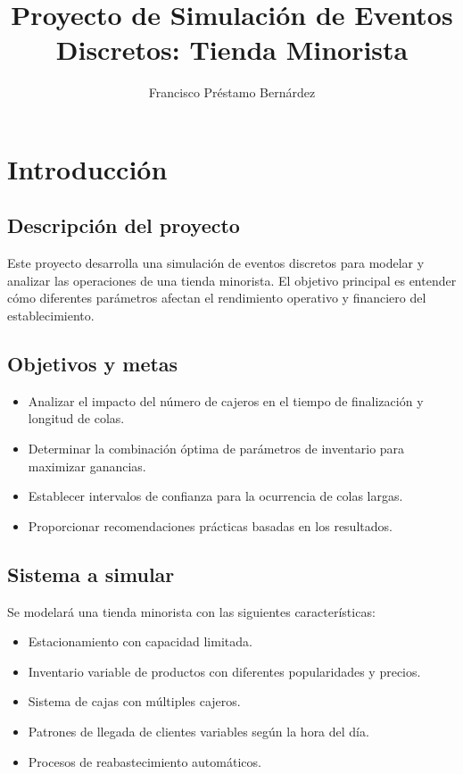 \documentclass[12pt, a4paper]{article}
\title{Proyecto de Simulación de Eventos Discretos: Tienda Minorista}
\author{Francisco Préstamo Bernárdez}
\date{}
\begin{document}
\maketitle

\newpage

\section{Introducción}

\subsection{Descripción del proyecto}
Este proyecto desarrolla una simulación de eventos discretos para modelar y analizar las operaciones de una tienda minorista. El objetivo principal es entender cómo diferentes parámetros afectan el rendimiento operativo y financiero del establecimiento.

\subsection{Objetivos y metas}
\begin{itemize}
    \item Analizar el impacto del número de cajeros en el tiempo de finalización y longitud de colas.
    \item Determinar la combinación óptima de parámetros de inventario para maximizar ganancias.
    \item Establecer intervalos de confianza para la ocurrencia de colas largas.
    \item Proporcionar recomendaciones prácticas basadas en los resultados.
\end{itemize}

\subsection{Sistema a simular}
Se modelará una tienda minorista con las siguientes características:
\begin{itemize}
    \item Estacionamiento con capacidad limitada.
    \item Inventario variable de productos con diferentes popularidades y precios.
    \item Sistema de cajas con múltiples cajeros.
    \item Patrones de llegada de clientes variables según la hora del día.
    \item Procesos de reabastecimiento automáticos.
\end{itemize}
\end{document}
